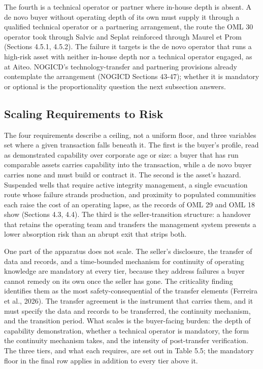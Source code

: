 The fourth is a technical operator or partner where in-house depth is
absent. A de novo buyer without operating depth of its own must supply
it through a qualified technical operator or a partnering arrangement,
the route the OML 30 operator took through Salvic and Seplat reinforced
through Maurel et Prom (Sections 4.5.1, 4.5.2). The failure it targets
is the de novo operator that runs a high-risk asset with neither
in-house depth nor a technical operator engaged, as at Aiteo. NOGICD's
technology-transfer and partnering provisions already contemplate the
arrangement (NOGICD Sections 43-47); whether it is mandatory or optional
is the proportionality question the next subsection answers.

\hypertarget{scaling-requirements-to-risk}{%
\subsection{Scaling Requirements to
Risk}\label{scaling-requirements-to-risk}}

The four requirements describe a ceiling, not a uniform floor, and three
variables set where a given transaction falls beneath it. The first is
the buyer's profile, read as demonstrated capability over corporate age
or size: a buyer that has run comparable assets carries capability into
the transaction, while a de novo buyer carries none and must build or
contract it. The second is the asset's hazard. Suspended wells that
require active integrity management, a single evacuation route whose
failure strands production, and proximity to populated communities each
raise the cost of an operating lapse, as the records of OML 29 and OML
18 show (Sections 4.3, 4.4). The third is the seller-transition
structure: a handover that retains the operating team and transfers the
management system presents a lower absorption risk than an abrupt exit
that strips both.

One part of the apparatus does not scale. The seller's disclosure, the
transfer of data and records, and a time-bounded mechanism for
continuity of operating knowledge are mandatory at every tier, because
they address failures a buyer cannot remedy on its own once the seller
has gone. The criticality finding identifies them as the most
safety-consequential of the transfer elements (Ferreira et al., 2026).
The transfer agreement is the instrument that carries them, and it must
specify the data and records to be transferred, the continuity
mechanism, and the transition period. What scales is the buyer-facing
burden: the depth of capability demonstration, whether a technical
operator is mandatory, the form the continuity mechanism takes, and the
intensity of post-transfer verification. The three tiers, and what each
requires, are set out in Table 5.5; the mandatory floor in the final row
applies in addition to every tier above it.

